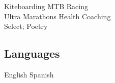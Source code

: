 \documentclass[letterpaper]{deedy-resume} %
\begin{document}
\begin{minipage}[t]{0.33\textwidth}
Kiteboarding \textbullet{} MTB Racing \\
Ultra Marathons \textbullet{} Health Coaching \\
Select; Poetry

\sectionspace %

\subsection{Languages}

English \textbullet{} Spanish








\end{minipage} %
\hfill
%
%
\end{document}
